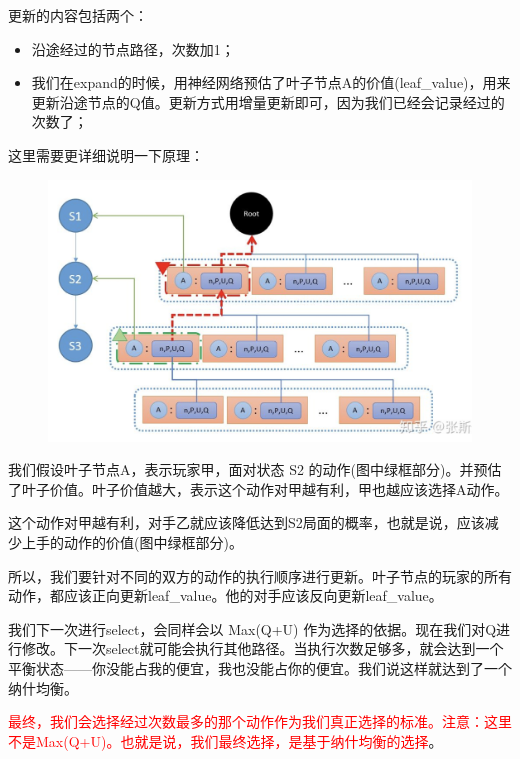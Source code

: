 \documentclass[12pt]{article}
\begin{document}
更新的内容包括两个：
\begin{itemize}
\setlength{\itemsep}{0pt}
\setlength{\parsep}{0pt}
\setlength{\parskip}{0pt}
    \item 沿途经过的节点路径，次数加1；
    \item 我们在expand的时候，用神经网络预估了叶子节点A的价值(leaf\_value)，用来更新沿途节点的Q值。更新方式用增量更新即可，因为我们已经会记录经过的次数了；
\end{itemize}

这里需要更详细说明一下原理：
\begin{figure}[H]
    \centering
    \includegraphics[width=.8\textwidth]{fig/ReinforcementLearning/AlphaZero_MCTS_5.png}
\end{figure}

我们假设叶子节点A，表示玩家甲，面对状态 S2 的动作(图中绿框部分)。并预估了叶子价值。叶子价值越大，表示这个动作对甲越有利，甲也越应该选择A动作。

这个动作对甲越有利，对手乙就应该降低达到S2局面的概率，也就是说，应该减少上手的动作的价值(图中绿框部分)。

所以，我们要针对不同的双方的动作的执行顺序进行更新。叶子节点的玩家的所有动作，都应该正向更新leaf\_value。他的对手应该反向更新leaf\_value。

我们下一次进行select，会同样会以 Max(Q+U) 作为选择的依据。现在我们对Q进行修改。下一次select就可能会执行其他路径。当执行次数足够多，就会达到一个平衡状态——你没能占我的便宜，我也没能占你的便宜。我们说这样就达到了一个纳什均衡。

\textcolor{red}{最终，我们会选择经过次数最多的那个动作作为我们真正选择的标准。注意：这里不是Max(Q+U)。也就是说，我们最终选择，是基于纳什均衡的选择}。
\end{document}
